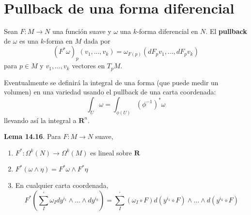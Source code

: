 \documentclass[11pt]{article}
\begin{document}
	\section{Pullback de una forma diferencial}
	
	Sean $F:M\longrightarrow N$ una función suave y  $\omega$ una $k$-forma diferencial en $N$. El \textbf{pullback} de $\omega$ es una $k$-forma en $M$ dada por  
	\begin{equation*}
		(F^*\omega)_p(v_1,...,v_k)=\omega_{F(p)}(dF_pv_1,...,dF_{p}v_k)
	\end{equation*}
	para $p\in M$ y $v_1,...,v_k$ vectores en $T_pM$.
	
	Eventualmente se definirá la integral de una forma (que puede medir un volumen) en una variedad usando el pullback de una carta coordenada:
	\begin{equation*}
		\int_U\omega=\int_{\phi(U)}(\phi^{-1})^*\omega
	\end{equation*}
	llevando así la integral a $\mathbf{R}^n$. \par
	\par\textbf{Lema 14.16}. Para $F:M\longrightarrow N$ suave,
	\begin{enumerate}[label=(\alph*)]
		\item $F^*:\Omega^k(N)\longrightarrow\Omega^k(M)$ es lineal sobre $\mathbf{R}$
		\item $F^*(\omega\wedge\eta)=F^*\omega\wedge F^*\eta$
		\item En cualquier carta coordenada,
		\begin{equation*}
			F^*\left(\sum_{I}^{'}\omega_Idy^{i_1}\wedge\ldots\wedge dy^{i_k}\right)=\sum_I^{'} (\omega_I\circ F) d(y^{i_1}\circ F)\wedge \ldots\wedge  d(y^{i_k}\circ F)
		\end{equation*}
	\end{enumerate}
	
\end{document}
